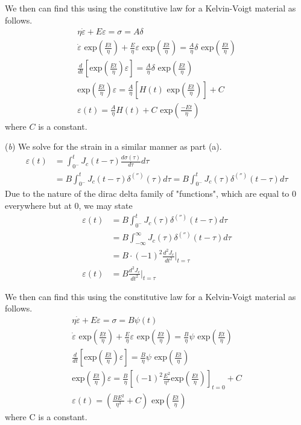 We then can find this using the constitutive law for a Kelvin-Voigt material as follows.
\begin{gather*}
    \eta\dot{\varepsilon}+E\varepsilon=\sigma=A\delta\\
    \dot{\varepsilon}\text{ exp}( \frac{Et}{\eta})+\frac{E}{\eta}\varepsilon\text{ exp}(\frac{Et}{\eta})=\frac{A}{\eta}\delta\text{ exp}(\frac{Et}{\eta})\\
    \frac{d}{dt}[\text{exp}(\frac{Et}{\eta})\varepsilon]=\frac{A}{\eta}\delta\text{ exp}(\frac{Et}{\eta})\\
    \text{exp}(\frac{Et}{\eta})\varepsilon=\frac{A}{\eta}[H(t)\text{ exp}(\frac{Et}{\eta})]+C\\
    \varepsilon(t)=\frac{A}{\eta}H(t)+C\text{ exp}(\frac{-Et}{\eta})
\end{gather*}
where $C$ is a constant.

(\textit{b}) We solve for the strain in a similar manner as part (a).
\begin{align*}
    \varepsilon(t)&=\int_{0^-}^tJ_c(t-\tau)\frac{d\sigma(\tau)}{d\tau}d\tau\\
    &=B\int_{0^-}^tJ_c(t-\tau)\delta^{('')}(\tau)d\tau=B\int_{0^-}^tJ_c(\tau)\delta^{('')}(t-\tau)d\tau
\end{align*}
Due to the nature of the dirac delta family of "functions", which are equal to 0 everywhere but at 0, we may state
\begin{align*}
    \varepsilon(t)&=B\int_{0^-}^tJ_c(\tau)\delta^{('')}(t-\tau)d\tau\\
    &=B\int_{-\infty}^{\infty}J_c(\tau)\delta^{('')}(t-\tau)d\tau\\
    &=B\cdot(-1)^2\frac{d^2J_c}{dt^2}|_{t=\tau}\\
    \varepsilon(t)&=B\frac{d^2J_c}{dt^2}|_{t=\tau}
\end{align*}

We then can find this using the constitutive law for a Kelvin-Voigt material as follows.
\begin{gather*}
    \eta\dot{\varepsilon}+E\varepsilon=\sigma=B\psi(t)\\
    \dot{\varepsilon}\text{ exp}( \frac{Et}{\eta})+\frac{E}{\eta}\varepsilon\text{ exp}(\frac{Et}{\eta})=\frac{B}{\eta}\psi\text{ exp}(\frac{Et}{\eta})\\
    \frac{d}{dt}[\text{exp}(\frac{Et}{\eta})\varepsilon]=\frac{B}{\eta}\psi\text{ exp}(\frac{Et}{\eta})\\
    \text{exp}(\frac{Et}{\eta})\varepsilon=\frac{B}{\eta}[(-1)^2\frac{E^2}{\eta^2}\text{exp}(\frac{Et}{\eta})]_{t=0}+C\\
    \varepsilon(t)=(\frac{BE^2}{\eta^3}+C)\text{ exp}(\frac{Et}{\eta})
\end{gather*}
where C is a constant.

